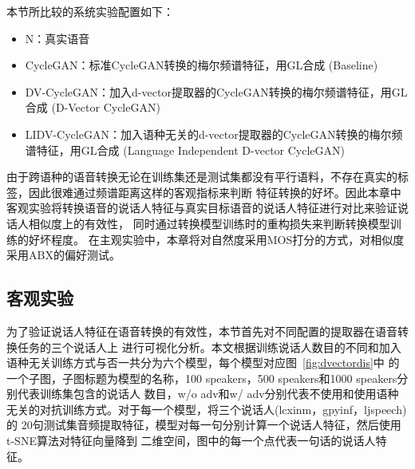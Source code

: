 本节所比较的系统实验配置如下：
\begin{itemize}
    \item N：真实语音
    \item CycleGAN：标准CycleGAN转换的梅尔频谱特征，用GL合成 (Baseline)
    \item DV-CycleGAN：加入d-vector提取器的CycleGAN转换的梅尔频谱特征，用GL合成 (D-Vector CycleGAN)
    \item LIDV-CycleGAN：加入语种无关的d-vector提取器的CycleGAN转换的梅尔频谱特征，用GL合成 (Language Independent D-vector CycleGAN)
\end{itemize}

由于跨语种的语音转换无论在训练集还是测试集都没有平行语料，不存在真实的标签，因此很难通过频谱距离这样的客观指标来判断
特征转换的好坏。因此本章中客观实验将转换语音的说话人特征与真实目标语音的说话人特征进行对比来验证说话人相似度上的有效性，
同时通过转换模型训练时的重构损失来判断转换模型训练的好坏程度。
在主观实验中，本章将对自然度采用MOS打分的方式，对相似度采用ABX的偏好测试。

\subsection{客观实验}

为了验证说话人特征在语音转换的有效性，本节首先对不同配置的提取器在语音转换任务的三个说话人上
进行可视化分析。本文根据训练说话人数目的不同和加入语种无关训练方式与否一共分为六个模型，每个模型对应图~\ref{fig:dvectordis}中
的一个子图，子图标题为模型的名称，100 speakers，500 speakers和1000 speakers分别代表训练集包含的说话人
数目，w/o adv和w/ adv分别代表不使用和使用语种无关的对抗训练方式。对于每一个模型，将三个说话人(lcxinm，gpyinf，ljspeech)的
20句测试集音频提取特征，模型对每一句分别计算一个说话人特征，然后使用t-SNE算法\cite{maaten2008visualizing}对特征向量降到
二维空间，图中的每一个点代表一句话的说话人特征。


